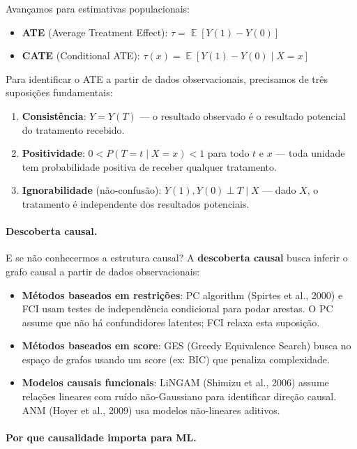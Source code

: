 \documentclass{tufte-handout}
\DeclareMathOperator{\E}{\mathbb{E}}
\begin{document}
Avançamos para estimativas populacionais:
\begin{itemize}
    \item \textbf{ATE} (Average Treatment Effect):
    $\tau = \E[Y(1) - Y(0)]$
    \item \textbf{CATE} (Conditional ATE):
    $\tau(x) = \E[Y(1) - Y(0) \mid X = x]$
\end{itemize}

Para identificar o ATE a partir de dados observacionais, precisamos de três
suposições fundamentais:

\begin{enumerate}
    \item \textbf{Consistência}: $Y = Y(T)$ --- o resultado observado é o resultado
    potencial do tratamento recebido.
    \item \textbf{Positividade}: $0 < P(T = t \mid X = x) < 1$ para todo $t$ e $x$
    --- toda unidade tem probabilidade positiva de receber qualquer tratamento.
    \item \textbf{Ignorabilidade} (não-confusão): $Y(1), Y(0) \perp T \mid X$ ---
    dado $X$, o tratamento é independente dos resultados potenciais.
\end{enumerate}

\paragraph{Descoberta causal.}

E se não conhecermos a estrutura causal? A \textbf{descoberta causal} busca inferir
o grafo causal a partir de dados observacionais:

\begin{itemize}
    \item \textbf{Métodos baseados em restrições}: PC algorithm (Spirtes et al., 2000)
    e FCI usam testes de independência condicional para podar arestas. O PC assume
    que não há confundidores latentes; FCI relaxa esta suposição.
    \item \textbf{Métodos baseados em score}: GES (Greedy Equivalence Search) busca
    no espaço de grafos usando um score (ex: BIC) que penaliza complexidade.
    \item \textbf{Modelos causais funcionais}: LiNGAM (Shimizu et al., 2006) assume
    relações lineares com ruído não-Gaussiano para identificar direção causal.
    ANM (Hoyer et al., 2009) usa modelos não-lineares aditivos.
\end{itemize}

\paragraph{Por que causalidade importa para ML.}
\end{document}
